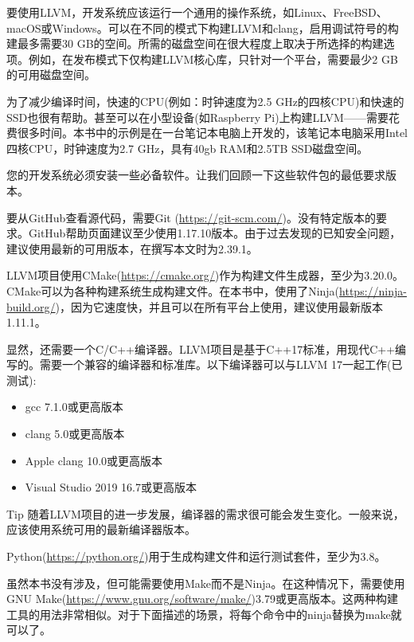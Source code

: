 
要使用LLVM，开发系统应该运行一个通用的操作系统，如Linux、FreeBSD、macOS或Windows。可以在不同的模式下构建LLVM和clang，启用调试符号的构建最多需要30 GB的空间。所需的磁盘空间在很大程度上取决于所选择的构建选项。例如，在发布模式下仅构建LLVM核心库，只针对一个平台，需要最少2 GB的可用磁盘空间。

为了减少编译时间，快速的CPU(例如：时钟速度为2.5 GHz的四核CPU)和快速的SSD也很有帮助。甚至可以在小型设备(如Raspberry Pi)上构建LLVM——需要花费很多时间。本书中的示例是在一台笔记本电脑上开发的，该笔记本电脑采用Intel四核CPU，时钟速度为2.7 GHz，具有40gb RAM和2.5TB SSD磁盘空间。

您的开发系统必须安装一些必备软件。让我们回顾一下这些软件包的最低要求版本。

要从GitHub查看源代码，需要Git (\url{https://git-scm.com/})。没有特定版本的要求。GitHub帮助页面建议至少使用1.17.10版本。由于过去发现的已知安全问题，建议使用最新的可用版本，在撰写本文时为2.39.1。

LLVM项目使用CMake(\url{https://cmake.org/})作为构建文件生成器，至少为3.20.0。CMake可以为各种构建系统生成构建文件。在本书中，使用了Ninja(\url{https://ninja-build.org/})，因为它速度快，并且可以在所有平台上使用，建议使用最新版本1.11.1。

显然，还需要一个C/C++编译器。LLVM项目是基于C++17标准，用现代C++编写的。需要一个兼容的编译器和标准库。以下编译器可以与LLVM 17一起工作(已测试):

\begin{itemize}
\item
gcc 7.1.0或更高版本

\item
clang 5.0或更高版本

\item
Apple clang 10.0或更高版本

\item
Visual Studio 2019 16.7或更高版本
\end{itemize}

\begin{myTip}{Tip}
随着LLVM项目的进一步发展，编译器的需求很可能会发生变化。一般来说，应该使用系统可用的最新编译器版本。
\end{myTip}

Python(\url{https://python.org/})用于生成构建文件和运行测试套件，至少为3.8。

虽然本书没有涉及，但可能需要使用Make而不是Ninja。在这种情况下，需要使用GNU Make(\url{https://www.gnu.org/software/make/})3.79或更高版本。这两种构建工具的用法非常相似。对于下面描述的场景，将每个命令中的ninja替换为make就可以了。

